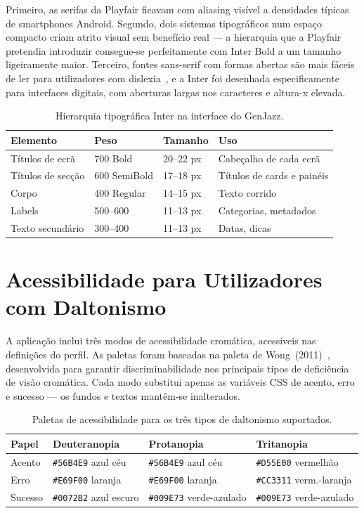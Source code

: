 Primeiro, as serifas da Playfair ficavam com aliasing visível a densidades típicas de smartphones Android. Segundo, dois sistemas tipográficos num espaço compacto criam atrito visual sem benefício real --- a hierarquia que a Playfair pretendia introduzir consegue-se perfeitamente com Inter Bold a um tamanho ligeiramente maior. Terceiro, fontes sans-serif com formas abertas são mais fáceis de ler para utilizadores com dislexia~\cite{bda2023}, e a Inter foi desenhada especificamente para interfaces digitais, com aberturas largas nos caracteres e altura-x elevada.

\begin{table}[!htb]
\centering\small
\begin{tabular}{llll}
\toprule
\textbf{Elemento} & \textbf{Peso} & \textbf{Tamanho} & \textbf{Uso} \\
\midrule
Títulos de ecrã   & 700 Bold     & 20--22 px & Cabeçalho de cada ecrã \\
Títulos de secção & 600 SemiBold & 17--18 px & Títulos de cards e painéis \\
Corpo             & 400 Regular  & 14--15 px & Texto corrido \\
Labels            & 500--600     & 11--13 px & Categorias, metadados \\
Texto secundário  & 300--400     & 11--13 px & Datas, dicas \\
\bottomrule
\end{tabular}
\caption{Hierarquia tipográfica Inter na interface do GenJazz.}
\label{tab:tipografia}
\end{table}

\section{Acessibilidade para Utilizadores com Daltonismo}
\label{chap4:sec:daltonismo}

A aplicação inclui três modos de acessibilidade cromática, acessíveis nas definições do perfil. As paletas foram baseadas na paleta de Wong~(2011)~\cite{wong2011}, desenvolvida para garantir discriminabilidade nos principais tipos de deficiência de visão cromática. Cada modo substitui apenas as variáveis CSS de acento, erro e sucesso --- os fundos e textos mantêm-se inalterados.

\begin{table}[!htb]
\centering\small
\begin{tabular}{lp{3.2cm}p{3.2cm}p{3.2cm}}
\toprule
\textbf{Papel} & \textbf{Deuteranopia} & \textbf{Protanopia} & \textbf{Tritanopia} \\
\midrule
Acento  & \texttt{\#56B4E9} azul céu    & \texttt{\#56B4E9} azul céu    & \texttt{\#D55E00} vermelhão \\
Erro    & \texttt{\#E69F00} laranja      & \texttt{\#E69F00} laranja      & \texttt{\#CC3311} verm.-laranja \\
Sucesso & \texttt{\#0072B2} azul escuro  & \texttt{\#009E73} verde-azulado & \texttt{\#009E73} verde-azulado \\
\bottomrule
\end{tabular}
\caption{Paletas de acessibilidade para os três tipos de daltonismo suportados.}
\label{tab:daltonismo}
\end{table}

